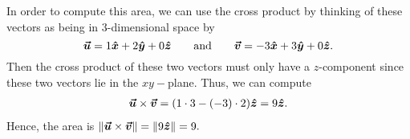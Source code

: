 \documentclass[12pt]{article} %
\begin{document}
\begin{solution}
\begin{enumerate}[(a)]
\begin{center}
        \end{center}
        In order to compute this area, we can use the cross product by thinking of these vectors as being in $3$-dimensional space by
        \[
        \boldsymbol{\vec{u}} = 1\boldsymbol{\hat{x}} + 2\boldsymbol{\hat{y}} + 0\boldsymbol{\hat{z}} \qquad \textrm{and} \qquad \boldsymbol{\vec{v}} = -3\boldsymbol{\hat{x}} +3\boldsymbol{\hat{y}} + 0\boldsymbol{\hat{z}}.
        \]
        Then the cross product of these two vectors must only have a $z$-component since these two vectors lie in the $xy-$plane. Thus, we can compute
        \begin{align*}
            \boldsymbol{\vec{u}} \times \boldsymbol{\vec{v}} = (1\cdot 3 - (-3)\cdot2)\boldsymbol{\hat{z}} = 9\boldsymbol{\hat{z}}.
        \end{align*}
        Hence, the area is $\|\boldsymbol{\vec{u}}\times \boldsymbol{\vec{v}}\| = \|9\boldsymbol{\hat{z}} \| = 9.$
\end{enumerate}
\end{solution}
\end{document}
